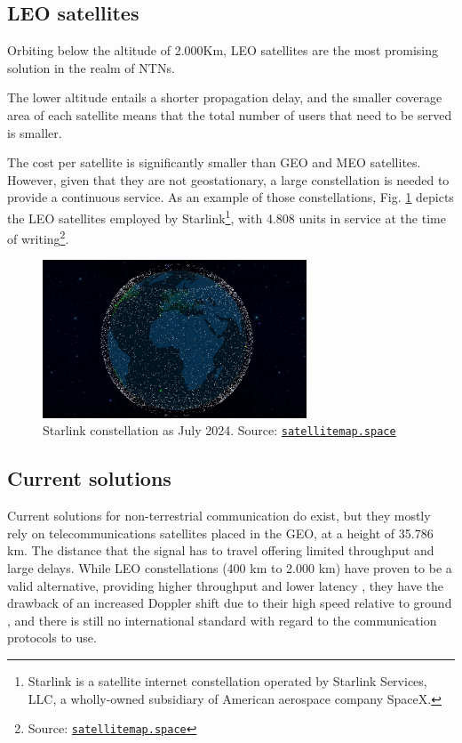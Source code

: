\subsection{\ac{LEO} satellites}
Orbiting below the altitude of 2.000Km, \ac{LEO} satellites are the most promising solution in the realm of \ac{NTNs}.
    
The lower altitude entails a shorter propagation delay, and the smaller coverage area of each satellite means that the total number of users that need to be served is smaller. 

The cost per satellite is significantly smaller than \ac{GEO} and \ac{MEO} satellites. However, given that they are not geostationary, a large constellation is needed to provide a continuous service. As an example of those constellations, Fig. \ref{fig:starlink_constellation} depicts the \ac{LEO} satellites employed by Starlink\footnote{Starlink is a satellite internet constellation operated by Starlink Services, LLC, a wholly-owned subsidiary of American aerospace company SpaceX.}, with 4.808 units in service at the time of writing\footnote{Source: \href{https://satellitemap.space/}{\texttt{satellitemap.space}}}.

\begin{figure}[ht]
    \centering
    \includegraphics[width=0.7\textwidth]{res/starlink-constellation.png}
    \caption{Starlink constellation as July 2024. Source: \href{https://satellitemap.space/}{\texttt{satellitemap.space}}}
    \label{fig:starlink_constellation}
\end{figure}


\subsection{Current solutions}
Current solutions for non-terrestrial communication do exist, but they mostly rely on telecommunications satellites placed in the \ac{GEO}, at a height of 35.786 km. The distance that the signal has to travel offering limited throughput and large delays. While \ac{LEO} constellations (400 km to 2.000 km) have proven to be a valid alternative, providing higher throughput and lower latency \cite{main-features-5g-nr-ntn-yun}, they have the drawback of an increased Doppler shift due to their high speed relative to ground \cite{satellite-communication-mmwave-giordani}, and there is still no international standard with regard to the communication protocols to use. 

